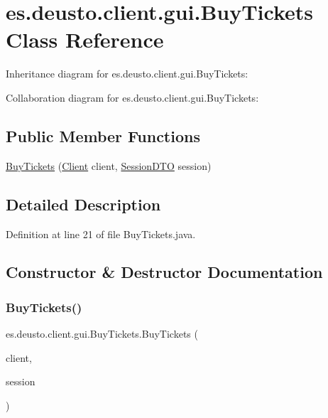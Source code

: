 \hypertarget{classes_1_1deusto_1_1client_1_1gui_1_1_buy_tickets}{}\section{es.\+deusto.\+client.\+gui.\+Buy\+Tickets Class Reference}
\label{classes_1_1deusto_1_1client_1_1gui_1_1_buy_tickets}


Inheritance diagram for es.\+deusto.\+client.\+gui.\+Buy\+Tickets\+:


Collaboration diagram for es.\+deusto.\+client.\+gui.\+Buy\+Tickets\+:
\subsection*{Public Member Functions}
\begin{DoxyCompactItemize}
\item 
\mbox{\hyperlink{classes_1_1deusto_1_1client_1_1gui_1_1_buy_tickets_a550c5b4787c8ffd333049cf8d6c32e48}{Buy\+Tickets}} (\mbox{\hyperlink{classes_1_1deusto_1_1client_1_1_client}{Client}} client, \mbox{\hyperlink{classes_1_1deusto_1_1server_1_1data_1_1_session_d_t_o}{Session\+D\+TO}} session)
\end{DoxyCompactItemize}


\subsection{Detailed Description}


Definition at line 21 of file Buy\+Tickets.\+java.



\subsection{Constructor \& Destructor Documentation}
\mbox{\label{classes_1_1deusto_1_1client_1_1gui_1_1_buy_tickets_a550c5b4787c8ffd333049cf8d6c32e48}} 
\subsubsection{\texorpdfstring{BuyTickets()}{BuyTickets()}}
{\footnotesize\ttfamily es.\+deusto.\+client.\+gui.\+Buy\+Tickets.\+Buy\+Tickets (\begin{DoxyParamCaption}\item[{\mbox{\hyperlink{classes_1_1deusto_1_1client_1_1_client}{Client}}}]{client,  }\item[{\mbox{\hyperlink{classes_1_1deusto_1_1server_1_1data_1_1_session_d_t_o}{Session\+D\+TO}}}]{session }\end{DoxyParamCaption})}


